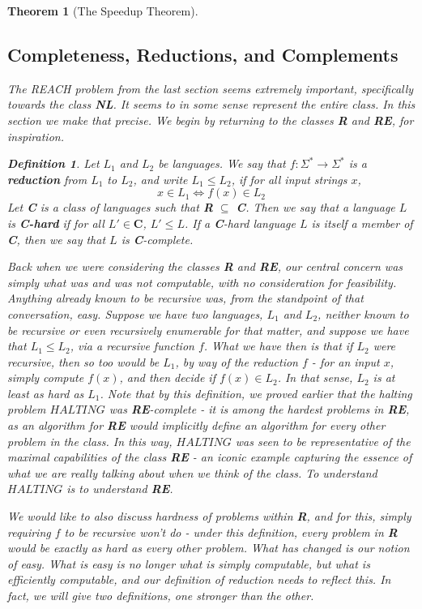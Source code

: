 \documentclass{article}
\theoremstyle{definition}
\newtheorem{definition}{Definition}[section]
\theoremstyle{plain}
\theoremstyle{theorem}
\newtheorem{theorem}{Theorem}[section]
\begin{document}
\begin{theorem}[The Speedup Theorem]
\subsection{Completeness, Reductions, and Complements}
The REACH problem from the last section seems extremely important, specifically towards the class \textbf{NL}. It seems to in some sense represent the entire class. In this section we make that precise. We begin by returning to the classes \textbf{R} and \textbf{RE}, for inspiration.
\begin{definition}
    Let $L_1$ and $L_2$ be languages. We say that $f:\Sigma^* \to \Sigma^*$ is a \textbf{reduction} from $L_1$ to $L_2$, and write $L_1 \leq L_2$, if for all input strings $x$, 
    \[ x\in L_1 \iff f(x) \in L_2 \]
    Let \textbf{C} is a class of languages such that \textbf{R} $\subseteq$ \textbf{C}. Then we say that a language $L$ is \textbf{C-hard} if for all $L' \in \textbf{C}$, $L' \leq L$. If a \textbf{C}-hard language $L$ is itself a member of \textbf{C}, then we say that $L$ is \textbf{C}-complete. 
\end{definition}
Back when we were considering the classes \textbf{R} and \textbf{RE}, our central concern was simply what was and was not computable, with no consideration for feasibility. Anything already known to be recursive was, from the standpoint of that conversation, easy. Suppose we have two languages, $L_1$ and $L_2$, neither known to be recursive or even recursively enumerable for that matter, and suppose we have that $L_1 \leq L_2$, via a recursive function $f$. What we have then is that if $L_2$ \textit{were} recursive, then so too would be $L_1$, by way of the reduction $f$ - for an input $x$, simply compute $f(x)$, and then decide if $f(x) \in L_2$. In that sense, $L_2$ is \textit{at least as hard} as $L_1$. Note that by this definition, we proved earlier that the halting problem $HALTING$ was \textbf{RE}-complete - it is among the hardest problems in \textbf{RE}, as an algorithm for \textbf{RE} would implicitly define an algorithm for every other problem in the class. In this way, $HALTING$ was seen to be representative of the maximal capabilities of the class \textbf{RE} - an iconic example capturing the essence of what we are really talking about when we think of the class. To understand $HALTING$ is to understand \textbf{RE}.
\par We would like to also discuss hardness of problems within \textbf{R}, and for this, simply requiring $f$ to be recursive won't do - under this definition, every problem in \textbf{R} would be exactly as hard as every other problem. What has changed is our notion of easy. What is easy is no longer what is simply computable, but what is efficiently computable, and our definition of reduction needs to reflect this. In fact, we will give two definitions, one stronger than the other. 

\end{theorem}
\end{document}
